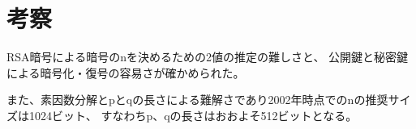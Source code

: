 \documentclass[a4j]{jsarticle}
\begin{document}
\section{考察}

RSA暗号による暗号のnを決めるための2値の推定の難しさと、
公開鍵と秘密鍵による暗号化・復号の容易さが確かめられた。

また、素因数分解とpとqの長さによる難解さであり2002年時点でのnの推奨サイズは1024ビット、
すなわちp、qの長さはおおよそ512ビットとなる。
\end{document}
